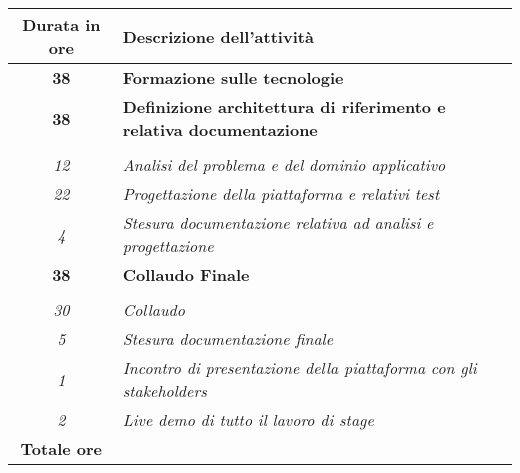 

\begin{tabularx}{\textwidth}{|c|X|}
	\hline
	\textbf{Durata in ore} & \textbf{Descrizione dell'attività} \\\hline
	
	\textbf{38} & \textbf{Formazione sulle tecnologie} \\	 
    \hline
    
    \textbf{38} & \textbf{Definizione architettura di riferimento e relativa documentazione} \\ \hdashline 
    \multirow{3}{0cm}\\ 
    \textit{12} & 
    \textit{Analisi del problema e del dominio applicativo} \\
    \textit{22} & 
    \textit{Progettazione della piattaforma e relativi test} \\
    \textit{4} & 
    \textit{Stesura documentazione relativa ad analisi e progettazione} \\
    \hline
    
    \textbf{38} & \textbf{Collaudo Finale}  \\ \hdashline 
    \multirow{4}{0cm}\\ 
    \textit{30} & 
    \textit{Collaudo} \\
    \textit{5} & 
    \textit{Stesura documentazione finale} \\
    \textit{1} & 
    \textit{Incontro di presentazione della piattaforma con gli stakeholders} \\
    \textit{2} & 
    \textit{Live demo di tutto il lavoro di stage} \\
    \hline
	
	\textbf{Totale ore} & \multicolumn{1}{|c|}{\textbf{\totaleOre}} \\\hline
	
	
\end{tabularx}
